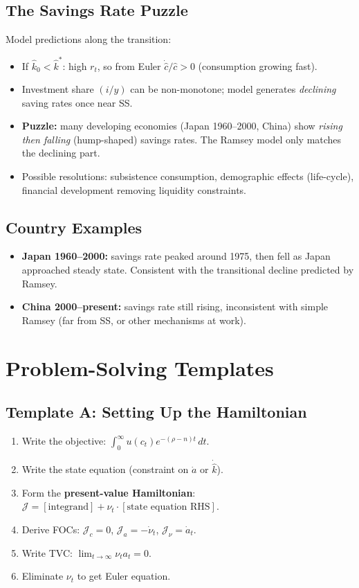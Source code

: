 \documentclass[a4paper,11pt]{article}
\newcommand{\khat}{\hat{k}}
\newcommand{\chat}{\hat{c}}
\begin{document}
\subsection*{The Savings Rate Puzzle}
Model predictions along the transition:
\begin{itemize}[leftmargin=*]
  \item If $\khat_0 < \khat^*$: high $r_t$, so from Euler $\dot{\chat}/\chat > 0$ (consumption growing fast).
  \item Investment share $(i/y)$ can be non-monotone; model generates \emph{declining} saving rates once near SS.
  \item \textbf{Puzzle:} many developing economies (Japan 1960--2000, China) show \emph{rising then falling} (hump-shaped) savings rates. The Ramsey model only matches the declining part.
  \item Possible resolutions: subsistence consumption, demographic effects (life-cycle), financial development removing liquidity constraints.
\end{itemize}

\subsection*{Country Examples}
\begin{itemize}[leftmargin=*]
  \item \textbf{Japan 1960--2000:} savings rate peaked around 1975, then fell as Japan approached steady state. Consistent with the transitional decline predicted by Ramsey.
  \item \textbf{China 2000--present:} savings rate still rising, inconsistent with simple Ramsey (far from SS, or other mechanisms at work).
\end{itemize}

\section{Problem-Solving Templates}

\subsection*{Template A: Setting Up the Hamiltonian}
\begin{enumerate}[leftmargin=*]
  \item Write the objective: $\int_0^\infty u(c_t) e^{-(\rho-n)t}\,dt$.
  \item Write the state equation (constraint on $\dot{a}$ or $\dot{\khat}$).
  \item Form the \textbf{present-value Hamiltonian}: $\mathcal{J} = [\text{integrand}] + \nu_t \cdot [\text{state equation RHS}]$.
  \item Derive FOCs: $\mathcal{J}_c = 0$, $\mathcal{J}_a = -\dot{\nu}_t$, $\mathcal{J}_\nu = \dot{a}_t$.
  \item Write TVC: $\lim_{t\to\infty} \nu_t a_t = 0$.
  \item Eliminate $\nu_t$ to get Euler equation.
\end{enumerate}
\end{document}
